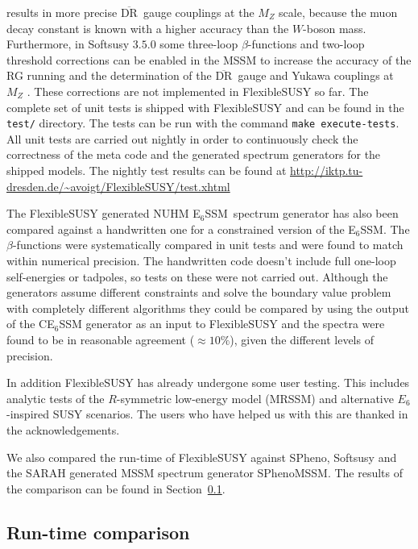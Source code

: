 \documentclass[final,3p,11pt,pdflatex]{elsarticle}
\makeatletter
\newcommand{\fs}{FlexibleSUSY\@\xspace}
\newcommand{\ESSM}{E$_6$SSM\@\xspace}
\newcommand{\code}[1]{\lstinline|#1|}  %
\newcommand{\textoverline}[1]{$\overline{\mbox{#1}}$}
\newcommand{\DRbar}{\textoverline{DR}\xspace}
\newcommand{\secref}[1]{Section~\ref{#1}}
\makeatother
\begin{document}
results in more precise \DRbar\ gauge couplings at the $M_Z$ scale,
because the muon decay constant is known with a higher accuracy than
the $W$-boson mass.  Furthermore, in Softsusy $3.5.0$ some three-loop
$\beta$-functions and two-loop threshold corrections can be enabled in
the MSSM to increase the accuracy of the RG running and the
determination of the \DRbar\ gauge and Yukawa couplings at $M_Z$
\cite{Allanach:2014nba}.  These corrections are not implemented in \fs
so far.  The complete set of unit tests is shipped with \fs and can be
found in the \code{test/} directory.  The tests can be run with the
command \code{make execute-tests}.  All unit tests are carried out
nightly in order to continuously check the correctness of the meta
code and the generated spectrum generators for the shipped models.
The nightly test results can be found at
\url{http://iktp.tu-dresden.de/~avoigt/FlexibleSUSY/test.xhtml}

The \fs generated NUHM \ESSM\ spectrum generator has also been
compared against a handwritten one for a constrained version of the
\ESSM \cite{Athron:2009ue, Athron:2009bs, Athron:2012pw}.  The
$\beta$-functions were systematically compared in unit tests and were
found to match within numerical precision.  The handwritten code
doesn't include full one-loop self-energies or tadpoles, so tests on
these were not carried out.  Although the generators assume different
constraints and solve the boundary value problem with completely
different algorithms they could be compared by using the output of
the CE$_6$SSM generator as an input to \fs and the spectra were found
to be in reasonable agreement ($\approx 10\%$), given the different
levels of precision.

In addition \fs has already undergone some user testing. This includes
analytic tests of the $R$-symmetric low-energy model (MRSSM) and
alternative $E_6$-inspired SUSY scenarios.  The users who have helped us
with this are thanked in the acknowledgements.

We also compared the run-time of \fs against SPheno, Softsusy and the
SARAH generated MSSM spectrum generator SPhenoMSSM.  The results of
the comparison can be found in \secref{sec:run-time comparison}.

\subsection{Run-time comparison}
\label{sec:run-time comparison}
\end{document}
